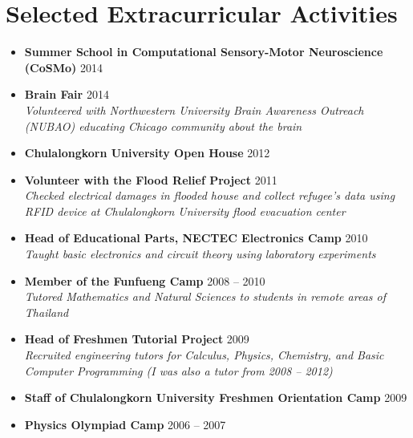 \section{\sc Selected Extracurricular Activities}

\begin{itemize}[leftmargin=0cm, label={}]
\item {\bf Summer School in Computational Sensory-Motor Neuroscience (CoSMo)} \hfill 2014

\item{\bf Brain Fair} \hfill 2014\\
{\em Volunteered with Northwestern University Brain Awareness Outreach (NUBAO) educating Chicago community about the brain}

\item {\bf Chulalongkorn University Open House} \hfill 2012

\item {\bf Volunteer with the Flood Relief Project} \hfill 2011 \\
{\em Checked electrical damages in flooded house and collect refugee's data using RFID device at Chulalongkorn University flood evacuation center}

\item {\bf Head of Educational Parts, NECTEC Electronics Camp} \hfill 2010 \\
{\em Taught basic electronics and circuit theory using laboratory experiments}

\item {\bf Member of the Funfueng Camp}	\hfill 2008 -- 2010 \\
{\em Tutored Mathematics and Natural Sciences to students in remote areas of Thailand}

\item {\bf Head of Freshmen Tutorial Project } \hfill 2009 \\
{\em Recruited engineering tutors for Calculus, Physics, Chemistry, and Basic Computer Programming (I was also a tutor from 2008 -- 2012)}

\item {\bf Staff of Chulalongkorn University Freshmen Orientation Camp} \hfill 2009

\item {\bf Physics Olympiad Camp} \hfill 2006 -- 2007

\end{itemize}
